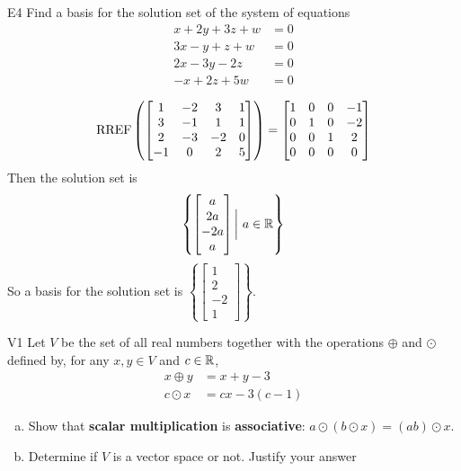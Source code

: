 \documentclass{sbgLAexam}
\begin{document}
\begin{problem}{E4}
Find a basis for the solution set of the system of equations
\begin{align*}
x+2y+3z+w &= 0 \\
3x-y+z+w &= 0 \\
2x-3y-2z &= 0 \\
-x+2z+5w &=0
\end{align*}
\end{problem}
\begin{solution}
$$\operatorname{RREF} \left(\begin{bmatrix} 1 & -2 & 3 & 1 \\ 3 & -1 & 1 & 1 \\ 2 & -3 & -2 & 0 \\ -1 & 0 & 2 & 5 \end{bmatrix} \right) = \begin{bmatrix} 1 & 0 & 0 & -1 \\ 0 & 1 & 0 & -2 \\ 0 & 0 & 1 & 2 \\ 0 & 0 & 0 & 0\end{bmatrix}$$
Then the solution set is
$$\left\{ \begin{bmatrix} a \\ 2a \\ -2a \\ a \end{bmatrix} \bigg |\ a \in \mathbb{R} \right\}$$
So a basis for the solution set is $\left\{\begin{bmatrix} 1 \\ 2 \\ -2 \\ 1\end{bmatrix} \right\}$.
\end{solution}


\begin{extract}\newpage\end{extract}
\begin{problem}{V1}
Let $V$ be the  set of all real numbers together with the operations $\oplus$ and $\odot$ defined by, for any $x,y \in V$ and $c \in \mathbb{R}$,
\begin{align*}
x\oplus y  &= x+y-3 \\
c \odot x &= cx-3(c-1)
\end{align*}
\begin{enumerate}[(a)]
\item Show that \textbf{scalar multiplication} is
      \textbf{associative}: \(a\odot(b\odot x)=(ab)\odot x\).
\item Determine if $V$ is a vector space or not.  Justify your answer
\end{enumerate}
\end{problem}
\end{document}
